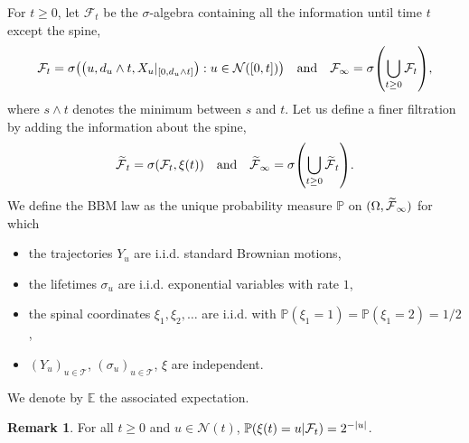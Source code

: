 \documentclass[10pt]{amsart}
\theoremstyle{definition}\newtheorem{defi}[theo]{Definition}\newtheorem{rema}[theo]{Remark}\newtheorem{exam}[theo]{Example}\newtheorem{exem}[theo]{Example}\newtheorem{nota}[theo]{Notation}
\newcommand{\E}{\mathbb{E}}
\renewcommand{\P}{\mathbb{P}}
\newcommand\1{\mathds{1}}
\newcommand{\cF}{\mathcal{F}}
\newcommand{\cN}{\mathcal{N}}
\newcommand{\cT}{\mathcal{T}}
\let\oldtilde\tilde
\renewcommand*{\tilde}[1]{\mathchoice{\widetilde{#1}}{\widetilde{#1}}{\oldtilde{#1}}{\oldtilde{#1}}}
\let\originalleft\left
\let\originalright\right
\renewcommand{\left}{\mathopen{}\mathclose\bgroup\originalleft}
\renewcommand{\right}{\aftergroup\egroup\originalright}
\begin{document}
For $t \geq 0$, let $\cF_t$ be the $\sigma$-algebra containing all the information until time $t$ except the spine,
\begin{equation*}
\cF_t = \sigma \left(\left(u, d_u \wedge t, X_u|_{[0, d_u \wedge t]} \right) : u \in \cN([0, t]) \right) \quad \text{and} \quad \cF_\infty = \sigma \left(\bigcup_{t \geq 0} \cF_t \right),
\end{equation*}
where $s \wedge t$ denotes the minimum between $s$ and $t$. Let us define a finer filtration by adding the information about the spine,
\begin{equation*}
\tilde{\cF}_t = \sigma \left(\cF_t, \xi(t) \right) \quad \text{and} \quad \tilde{\cF}_\infty = \sigma \left(\bigcup_{t \geq 0} \tilde{\cF}_t \right).
\end{equation*}
We define the BBM law as the unique probability measure $\P$ on $(\Omega, \tilde{\cF}_\infty)$ for which
\begin{itemize}
\item the trajectories $Y_u$ are i.i.d. standard Brownian motions,
\item the lifetimes $\sigma_u$ are i.i.d. exponential variables with rate $1$,
\item the spinal coordinates $\xi_1, \xi_2, \dots$ are i.i.d. with $\P(\xi_1 = 1) = \P(\xi_1 = 2) = 1/2$,
\item $(Y_u)_{u \in \cT}$, $(\sigma_u)_{u \in \cT}$, $\xi$ are independent.
\end{itemize}
We denote by $\E$ the associated expectation.

\begin{rema}\label{rem:probability_to_be_the_spine}
For all $t \geq 0$ and $u \in \cN(t)$, $\P \left(\xi(t) = u \middle| \cF_t \right) = 2^{-|u|}$.
\end{rema}
\end{document}
